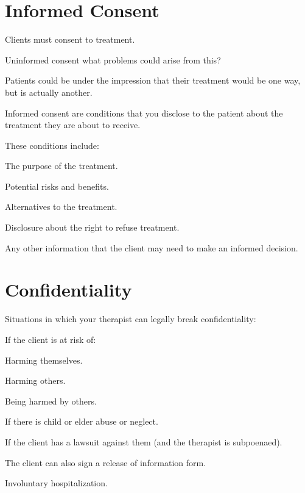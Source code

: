 \section{Informed Consent}

\begin{coloredlist}
    \item Clients must consent to treatment.
    \begin{coloredlist}
        \item Uninformed consent \textendash what problems could arise from this?
        \begin{coloredlist}
            \item Patients could be under the impression that their treatment would be one way, but is actually another.
        \end{coloredlist}
        \item Informed consent are conditions that you disclose to the patient about the treatment they are about to receive.
        \item These conditions include:
        \begin{coloredlist}
            \item The purpose of the treatment.
            \item Potential risks and benefits.
            \item Alternatives to the treatment.
            \item Disclosure about the right to refuse treatment.
            \item Any other information that the client may need to make an informed decision.
        \end{coloredlist}
    \end{coloredlist}
\end{coloredlist}

\section{Confidentiality}

Situations in which your therapist can legally break confidentiality:
\begin{coloredlist}
    \item If the client is at risk of:
    \begin{coloredlist}
        \item Harming themselves.
        \item Harming others.
        \item Being harmed by others.
    \end{coloredlist}
    \item If there is child or elder abuse or neglect.
    \item If the client has a lawsuit against them (and the therapist is subpoenaed).
    \item The client can also sign a release of information form.
    \item Involuntary hospitalization.
\end{coloredlist}

